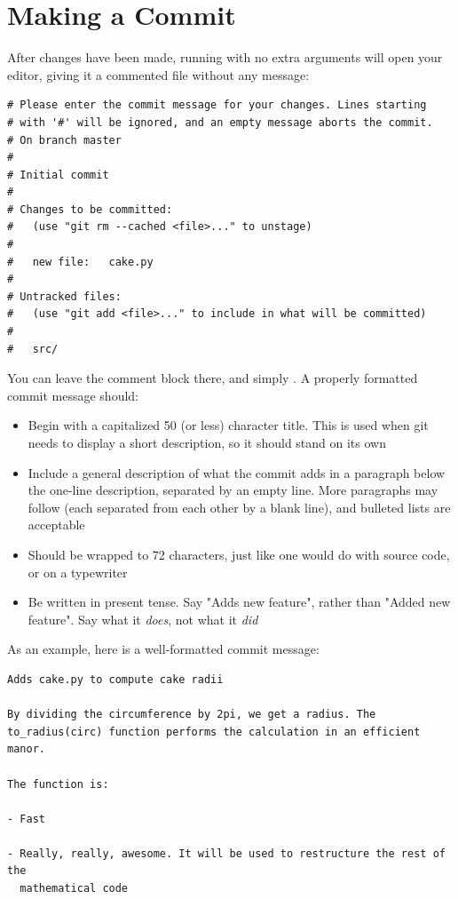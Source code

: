 \documentclass[11pt,letterpaper,twoside]{report}
\begin{document}
\section{Making a Commit}

After changes have been made, running  with no extra arguments
will open your editor, giving it a commented file without any message:

\begin{lstlisting}[numbers=none]
# Please enter the commit message for your changes. Lines starting
# with '#' will be ignored, and an empty message aborts the commit.
# On branch master
#
# Initial commit
#
# Changes to be committed:
#   (use "git rm --cached <file>..." to unstage)
#
#   new file:   cake.py
#
# Untracked files:
#   (use "git add <file>..." to include in what will be committed)
#
#   src/
\end{lstlisting}

You can leave the comment block there, and simply . A properly formatted commit message should:

\begin{itemize}
\item Begin with a capitalized 50 (or less) character title. This is used when
    git needs to display a short description, so it should stand on its own
\item Include a general description of what the commit adds in a paragraph below
    the one-line description, separated by an empty line. More paragraphs may
    follow (each separated from each other by a blank line), and bulleted lists
    are acceptable
\item Should be wrapped to 72 characters, just like one would do with source
    code, or on a typewriter
\item Be written in present tense. Say "Adds new feature", rather than "Added
    new feature". Say what it \emph{does}, not what it \emph{did}
\end{itemize}

As an example, here is a well-formatted commit message:


\begin{lstlisting}[numbers=none]
Adds cake.py to compute cake radii

By dividing the circumference by 2pi, we get a radius. The
to_radius(circ) function performs the calculation in an efficient manor.

The function is:

- Fast

- Really, really, awesome. It will be used to restructure the rest of the
  mathematical code
\end{lstlisting}
\end{document}
